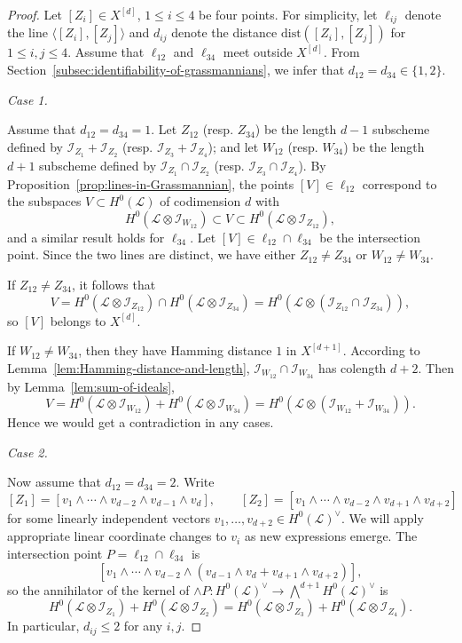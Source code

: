 \documentclass[10pt,a4paper]{amsart}
\def \Ical {\mathcal{I}}
\def \Lcal {\mathcal{L}}
\begin{document}
\begin{proof}
Let $[Z_i] \in X^{[d]}$, $1 \leq i \leq 4$ be four points.
For simplicity, let $\ell_{ij}$ denote the line $\langle [Z_i], [Z_j] \rangle$ and $d_{ij}$ denote the distance $\mathrm{dist}([Z_i], [Z_j])$ for $1 \leq i, j \leq 4$.
Assume that $\ell_{12}$ and $\ell_{34}$ meet outside $X^{[d]}$.
From Section~\ref{subsec:identifiability-of-grassmannians}, we infer that $d_{12} = d_{34} \in \{ 1,2 \}$.

\hypertarget{Case1-1}{\textit{Case 1.}} Assume that 
$d_{12} = d_{34} = 1$.
Let $Z_{12}$ (resp. $Z_{34}$) be the length $d-1$ subscheme defined by $\Ical_{Z_1} + \Ical_{Z_2}$ (resp. $\Ical_{Z_3} + \Ical_{Z_4}$); and let $W_{12}$ (resp. $W_{34}$) be the length $d+1$ subscheme defined by $\Ical_{Z_1} \cap \Ical_{Z_2}$ (resp. $\Ical_{Z_3} \cap \Ical_{Z_4}$).
By Proposition~\ref{prop:lines-in-Grassmannian}, the points $[V] \in \ell_{12}$ correspond to the subspaces $V \subset H^0(\Lcal)$ of codimension $d$ with
 \[
  H^0(\Lcal \otimes \Ical_{W_{12}}) \subset V \subset H^0(\Lcal \otimes \Ical_{Z_{12}}),
 \]
and a similar result holds for $\ell_{34}$.
Let $[V] \in \ell_{12} \cap \ell_{34}$ be the intersection point.
Since the two lines are distinct, we have either $Z_{12} \neq Z_{34}$ or $W_{12} \neq W_{34}$.

If $Z_{12} \neq Z_{34}$, it follows that
 \[
  V = H^0(\Lcal \otimes \Ical_{Z_{12}}) \cap H^0(\Lcal \otimes \Ical_{Z_{34}})
    = H^0(\Lcal \otimes (\Ical_{Z_{12}} \cap \Ical_{Z_{34}})),
 \]
so $[V]$ belongs to $X^{[d]}$.

If $W_{12} \neq W_{34}$, then they have Hamming distance $1$ in $X^{[d+1]}$.
According to Lemma~\ref{lem:Hamming-distance-and-length}, $\Ical_{W_{12}} \cap \Ical_{W_{34}}$ has colength $d+2$.
Then by Lemma~\ref{lem:sum-of-ideals}, 
 \[
  V = H^0(\Lcal \otimes \Ical_{W_{12}}) + H^0(\Lcal \otimes \Ical_{W_{34}}) = H^0(\Lcal \otimes (\Ical_{W_{12}} + \Ical_{W_{34}})).
 \]
Hence we would get a contradiction in any cases.

\hypertarget{Case1-2}{\textit{Case 2.}} Now assume that $d_{12} = d_{34} = 2$.
Write
 \[
  [Z_1] = [v_1 \wedge \cdots \wedge v_{d-2} \wedge v_{d-1} \wedge v_d], \qquad
  [Z_2] = [v_1 \wedge \cdots \wedge v_{d-2} \wedge v_{d+1} \wedge v_{d+2}]
 \]
for some linearly independent vectors $v_1, \dots, v_{d+2} \in H^0(\Lcal)^{\vee}$.
We will apply appropriate linear coordinate changes to $v_i$ as new expressions emerge.
The intersection point $P = \ell_{12} \cap \ell_{34}$ is
 \[
  [v_1 \wedge \cdots \wedge v_{d-2} \wedge (v_{d-1} \wedge v_d + v_{d+1} \wedge v_{d+2})],
 \]
so the annihilator of the kernel of $\wedge P : H^0(\Lcal)^{\vee}\rightarrow \bigwedge^{d+1} H^0(\Lcal)^{\vee}$ is
\[
    H^0(\Lcal \otimes \Ical_{Z_1})+H^0(\Lcal \otimes \Ical_{Z_2})=H^0(\Lcal \otimes \Ical_{Z_3})+H^0(\Lcal \otimes \Ical_{Z_4}).
\]
In particular, $d_{ij} \leq 2$ for any $i,j$.


\end{proof}
\end{document}
